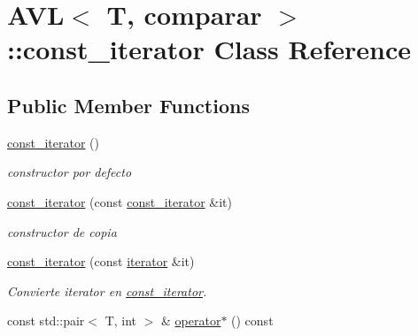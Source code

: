 \hypertarget{classAVL_1_1const__iterator}{\section{A\-V\-L$<$ T, comparar $>$\-:\-:const\-\_\-iterator Class Reference}
\label{classAVL_1_1const__iterator}
}
\subsection*{Public Member Functions}
\begin{DoxyCompactItemize}
\item 
\hypertarget{classAVL_1_1const__iterator_aa947543131e8a00f85d7da6092e386f0}{\hyperlink{classAVL_1_1const__iterator_aa947543131e8a00f85d7da6092e386f0}{const\-\_\-iterator} ()}\label{classAVL_1_1const__iterator_aa947543131e8a00f85d7da6092e386f0}

\begin{DoxyCompactList}\small\item\em constructor por defecto \end{DoxyCompactList}\item 
\hyperlink{classAVL_1_1const__iterator_ac971b495119e7c71917ceda480143e9d}{const\-\_\-iterator} (const \hyperlink{classAVL_1_1const__iterator}{const\-\_\-iterator} \&it)
\begin{DoxyCompactList}\small\item\em constructor de copia \end{DoxyCompactList}\item 
\hypertarget{classAVL_1_1const__iterator_ad4dc920b95668ca92865ba675623c885}{\hyperlink{classAVL_1_1const__iterator_ad4dc920b95668ca92865ba675623c885}{const\-\_\-iterator} (const \hyperlink{classAVL_1_1iterator}{iterator} \&it)}\label{classAVL_1_1const__iterator_ad4dc920b95668ca92865ba675623c885}

\begin{DoxyCompactList}\small\item\em Convierte iterator en \hyperlink{classAVL_1_1const__iterator}{const\-\_\-iterator}. \end{DoxyCompactList}\item 
\hypertarget{classAVL_1_1const__iterator_a17c883a19053252e9084c78a57a1314d}{const std\-::pair$<$ T, int $>$ \& \hyperlink{classAVL_1_1const__iterator_a17c883a19053252e9084c78a57a1314d}{operator$\ast$} () const }\label{classAVL_1_1const__iterator_a17c883a19053252e9084c78a57a1314d}


\end{DoxyCompactItemize}

